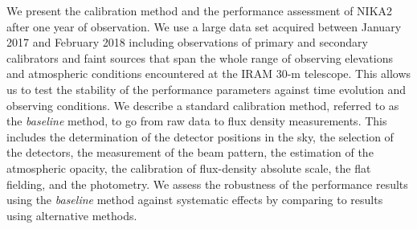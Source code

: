\documentclass[traditionalabstract]{aa}
\newcommand{\lp}[1]{#1}
\begin{document}
       {We present {\lp the calibration method} and the performance assessment of NIKA2 after one year of observation.}
       {We use a large data set acquired between January 2017 and
         February 2018 including observations of primary and secondary
         calibrators and faint sources that span the whole range
         of observing elevations and atmospheric conditions encountered at the
         IRAM 30-m telescope. This allows us to test the stability of the
         performance parameters against time evolution and
         observing conditions. {\lp We describe a standard calibration
         method, referred to as the \emph{baseline} method, to go from
         raw data to flux density measurements. This includes the
         determination of the detector positions in the sky, the
         selection of the detectors, the measurement of
         the beam pattern, the estimation of the 
         atmospheric opacity, the calibration of flux-density absolute
         scale, the flat fielding, and the photometry. We
         assess the robustness of the performance results using the
         \emph{baseline} method against systematic effects by
         comparing to results using alternative methods.}  
       }
\end{document}
